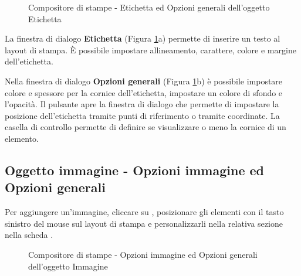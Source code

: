 \begin{figure}[ht]
\centering
   \hspace{1cm}
   \caption{Compositore di stampe - Etichetta ed Opzioni generali dell'oggetto Etichetta \nixcaption}\label{fig:label_option}
\end{figure}


La finestra di dialogo \textbf{Etichetta} (Figura \ref{fig:label_option}a) permette di inserire un testo al layout di stampa. È possibile 
impostare allineamento, carattere, colore e margine dell'etichetta.


Nella finestra di dialogo \textbf{Opzioni generali} (Figura \ref{fig:label_option}b) è possibile 
impostare colore e spessore per la cornice dell'etichetta, impostare un colore di sfondo e l'opacità. 
Il pulsante  apre la finestra di 
dialogo  che permette di impostare la posizione dell'etichetta 
tramite punti di riferimento o tramite coordinate.
La casella di controllo  permette di definire se visualizzare o 
meno la cornice di un elemento.

\subsection{Oggetto immagine - Opzioni immagine ed Opzioni generali}

Per aggiungere un'immagine, cliccare su ,
posizionare gli elementi con il tasto sinistro del mouse sul layout di stampa e personalizzarli 
nella relativa sezione nella scheda .

\begin{figure}[ht]
\centering
     \hspace{1cm}
   \caption{Compositore di stampe - Opzioni immagine ed Opzioni generali dell'oggetto Immagine \nixcaption}\label{fig:imageoptions}
\end{figure}

